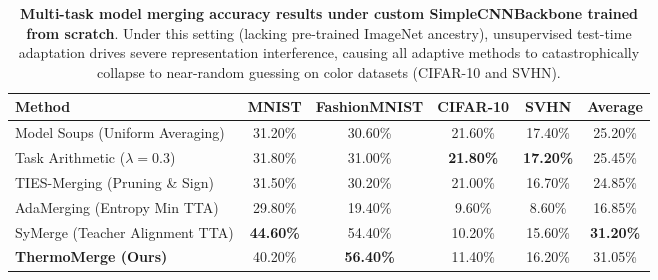 \documentclass{article}
\theoremstyle{plain}
\theoremstyle{definition}
\theoremstyle{remark}
\begin{document}
\begin{table}[h]
\centering
\caption{\textbf{Multi-task model merging accuracy results under custom SimpleCNNBackbone trained from scratch}. Under this setting (lacking pre-trained ImageNet ancestry), unsupervised test-time adaptation drives severe representation interference, causing all adaptive methods to catastrophically collapse to near-random guessing on color datasets (CIFAR-10 and SVHN).}
\label{tab:simple_cnn_results}
\vskip 0.15in
\begin{small}
\begin{sc}
\begin{tabular}{lccccc}
\toprule
Method & MNIST & FashionMNIST & CIFAR-10 & SVHN & \textbf{Average} \\
\midrule
Model Soups (Uniform Averaging)    & 31.20\% & 30.60\% & 21.60\% & 17.40\% & 25.20\% \\
Task Arithmetic ($\lambda = 0.3$) & 31.80\% & 31.00\% & \textbf{21.80\%} & \textbf{17.20\%} & 25.45\% \\
TIES-Merging (Pruning \& Sign)     & 31.50\% & 30.20\% & 21.00\% & 16.70\% & 24.85\% \\
AdaMerging (Entropy Min TTA)       & 29.80\% & 19.40\% &  9.60\% &  8.60\% & 16.85\% \\
SyMerge (Teacher Alignment TTA)    & \textbf{44.60\%} & 54.40\% & 10.20\% & 15.60\% & \textbf{31.20\%} \\
\textbf{ThermoMerge (Ours)}        & 40.20\% & \textbf{56.40\%} & 11.40\% & 16.20\% & 31.05\% \\
\bottomrule
\end{tabular}
\end{sc}
\end{small}
\end{table}
\end{document}

